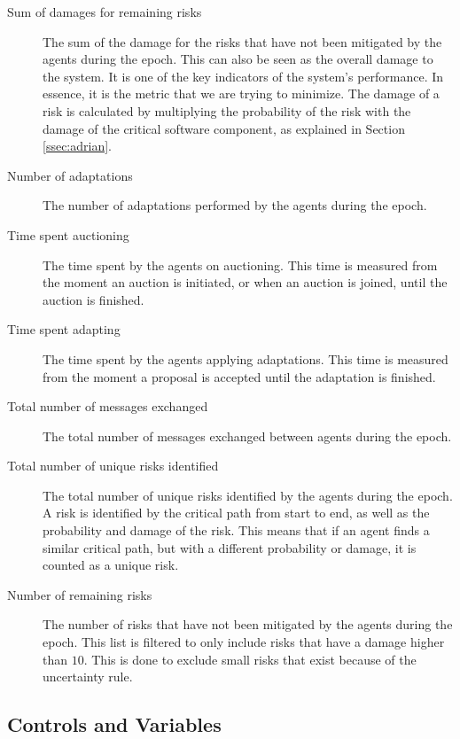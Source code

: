 \begin{description}
    \item[Sum of damages for remaining risks] The sum of the damage for the risks that have not been mitigated by the agents during the epoch. This can also be seen as the overall damage to the system. It is one of the key indicators of the system's performance. In essence, it is the metric that we are trying to minimize. The damage of a risk is calculated by multiplying the probability of the risk with the damage of the critical software component, as explained in Section \ref{ssec:adrian}. 
    \item[Number of adaptations] The number of adaptations performed by the agents during the epoch.
    \item[Time spent auctioning] The time spent by the agents on auctioning. This time is measured from the moment an auction is initiated, or when an auction is joined, until the auction is finished. 
    \item[Time spent adapting] The time spent by the agents applying adaptations. This time is measured from the moment a proposal is accepted until the adaptation is finished.
    \item[Total number of messages exchanged] The total number of messages exchanged between agents during the epoch.
    \item[Total number of unique risks identified] The total number of unique risks identified by the agents during the epoch. A risk is identified by the critical path from start to end, as well as the probability and damage of the risk. This means that if an agent finds a similar critical path, but with a different probability or damage, it is counted as a unique risk.
    \item[Number of remaining risks] The number of risks that have not been mitigated by the agents during the epoch. This list is filtered to only include risks that have a damage higher than $10$. This is done to exclude small risks that exist because of the uncertainty rule.
\end{description}

\subsection{Controls and Variables}
\label{ssec:controls-variables}

